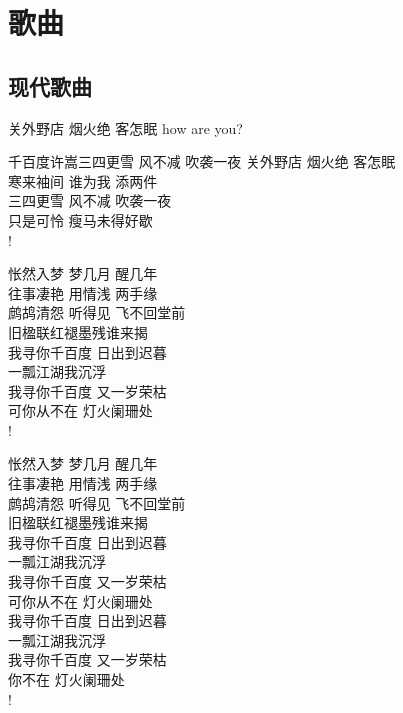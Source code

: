 \part{歌曲}

\chapter{现代歌曲}

关外野店 烟火绝 客怎眠
how are you?

\begin{poem}{千百度}{许嵩}{三四更雪 风不减 吹袭一夜}
关外野店 烟火绝 客怎眠\\
寒来袖间 谁为我 添两件\\
三四更雪 风不减 吹袭一夜\\
只是可怜 瘦马未得好歇\\!

怅然入梦 梦几月 醒几年 \\
往事凄艳 用情浅 两手缘 \\
鹧鸪清怨 听得见 飞不回堂前 \\
旧楹联红褪墨残谁来揭 \\
我寻你千百度 日出到迟暮 \\
一瓢江湖我沉浮 \\
我寻你千百度 又一岁荣枯 \\
可你从不在 灯火阑珊处 \\!

怅然入梦 梦几月 醒几年 \\
往事凄艳 用情浅 两手缘 \\
鹧鸪清怨 听得见 飞不回堂前 \\
旧楹联红褪墨残谁来揭 \\
我寻你千百度 日出到迟暮 \\
一瓢江湖我沉浮 \\
我寻你千百度 又一岁荣枯 \\
可你从不在 灯火阑珊处 \\
我寻你千百度 日出到迟暮 \\
一瓢江湖我沉浮 \\
我寻你千百度 又一岁荣枯 \\
你不在 灯火阑珊处 \\!
\end{poem}
